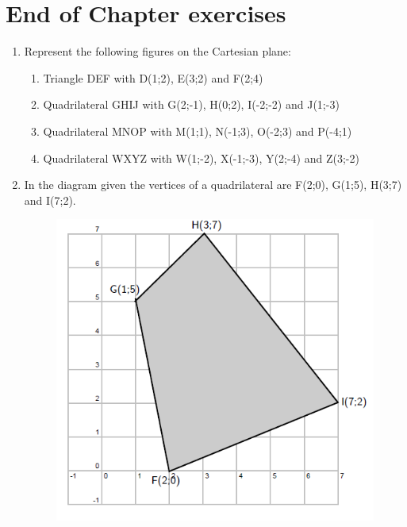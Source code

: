 \par 
\label{m39167*secfhsst!!!underscore!!!id2370}
            \section{ End of Chapter exercises}
            \nopagebreak
            
        \label{m39167*id69671}\begin{enumerate}[noitemsep, label=\textbf{\arabic*}. ] 
            \label{m39167*uid43466}\item 
Represent the following figures on the Cartesian plane: \label{m39167*id6549695}\begin{enumerate}[noitemsep, label=\textbf{\alph*}. ] 
            \label{m39167*uid4746}\item 
Triangle DEF with D(1;2), E(3;2) and F(2;4) 
\label{m39167*uid4548}\item Quadrilateral GHIJ with G(2;-1), H(0;2), I(-2;-2) and J(1;-3)
\label{m39167*uid4549}\item  Quadrilateral MNOP with M(1;1), N(-1;3), O(-2;3) and P(-4;1) 
\label{m39167*uid5450}\item  Quadrilateral WXYZ with W(1;-2), X(-1;-3), Y(2;-4) and Z(3;-2)
\end{enumerate}
                \label{m39167*uid46}\item 
In the diagram given the vertices of a quadrilateral are F(2;0), G(1;5), H(3;7) and I(7;2).

    \setcounter{subfigure}{0}


	\begin{figure}[H] %
    \begin{center}
    \label{m39167*id69688!!!underscore!!!media}\label{m39167*id69688!!!underscore!!!printimage}\includegraphics{col11306.imgs/m39167_MG10C14_021.png} %
        

\end{center}
\end{figure}
\end{enumerate}
